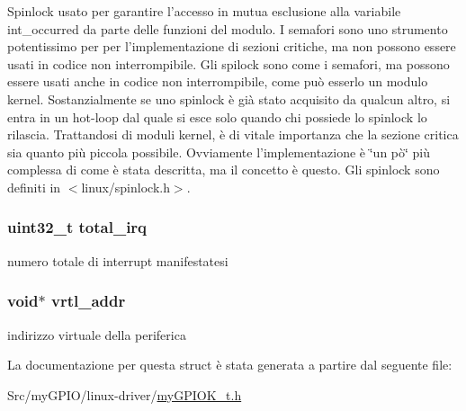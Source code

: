 Spinlock usato per garantire l'accesso in mutua esclusione alla variabile int\+\_\+occurred da parte delle funzioni del modulo. I semafori sono uno strumento potentissimo per per l'implementazione di sezioni critiche, ma non possono essere usati in codice non interrompibile. Gli spilock sono come i semafori, ma possono essere usati anche in codice non interrompibile, come può esserlo un modulo kernel. Sostanzialmente se uno spinlock è già stato acquisito da qualcun altro, si entra in un hot-\/loop dal quale si esce solo quando chi possiede lo spinlock lo rilascia. Trattandosi di moduli kernel, è di vitale importanza che la sezione critica sia quanto più piccola possibile. Ovviamente l'implementazione è \char`\"{}un pò\char`\"{} più complessa di come è stata descritta, ma il concetto è questo. Gli spinlock sono definiti in $<$linux/spinlock.\+h$>$. \hypertarget{structmy_g_p_i_o_k__t_a2da711ac290a9613b8d8af97f122b997}{
\subsubsection[{total\+\_\+irq}]{\setlength{\rightskip}{0pt plus 5cm}uint32\+\_\+t total\+\_\+irq}}\label{structmy_g_p_i_o_k__t_a2da711ac290a9613b8d8af97f122b997}
numero totale di interrupt manifestatesi \hypertarget{structmy_g_p_i_o_k__t_af5aef493b3c2bc9d1f036ce0acea9bba}{
\subsubsection[{vrtl\+\_\+addr}]{\setlength{\rightskip}{0pt plus 5cm}void$\ast$ vrtl\+\_\+addr}}\label{structmy_g_p_i_o_k__t_af5aef493b3c2bc9d1f036ce0acea9bba}
indirizzo virtuale della periferica 

La documentazione per questa struct è stata generata a partire dal seguente file\+:\begin{DoxyCompactItemize}
\item 
Src/my\+G\+P\+I\+O/linux-\/driver/\hyperlink{my_g_p_i_o_k__t_8h}{my\+G\+P\+I\+O\+K\+\_\+t.\+h}\end{DoxyCompactItemize}
